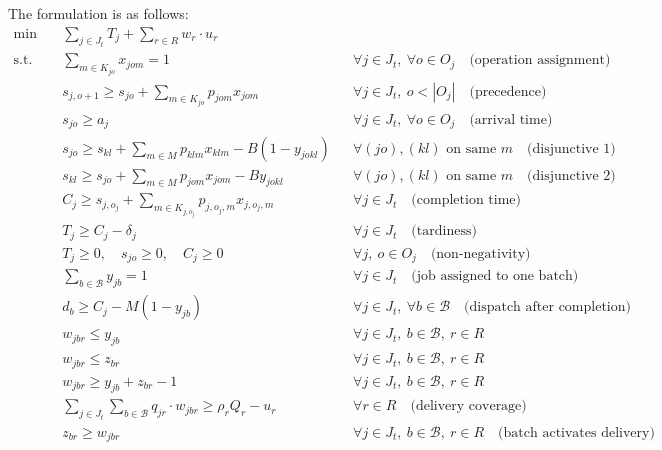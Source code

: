 \documentclass{article}
\begin{document}
The formulation is as follows:
\begin{align}
\min \quad & \sum_{j \in J_t} T_j + \sum_{r \in R} w_r \cdot u_r \\[4pt]
\text{s.t.} \quad
& \sum_{m \in K_{jo}} x_{jom} = 1 && \forall j \in J_t,\ \forall o \in O_j \quad \text{(operation assignment)} \\[4pt]
& s_{j,o+1} \geq s_{jo} + \sum_{m \in K_{jo}} p_{jom} x_{jom} && \forall j \in J_t,\ o < |O_j| \quad \text{(precedence)} \\[4pt]
& s_{jo} \geq a_j && \forall j \in J_t,\ \forall o \in O_j \quad \text{(arrival time)} \\[4pt]
& s_{jo} \geq s_{kl} + \sum_{m \in M} p_{klm} x_{klm} - B (1 - y_{jokl}) && \forall (jo), (kl) \text{ on same } m \quad \text{(disjunctive 1)} \\[4pt]
& s_{kl} \geq s_{jo} + \sum_{m \in M} p_{jom} x_{jom} - B y_{jokl} && \forall (jo), (kl) \text{ on same } m \quad \text{(disjunctive 2)} \\[4pt]
& C_j \geq s_{j,o_j} + \sum_{m \in K_{j,o_j}} p_{j,o_j,m} x_{j,o_j,m} && \forall j \in J_t \quad \text{(completion time)} \\[4pt]
& T_j \geq C_j - \delta_j && \forall j \in J_t \quad \text{(tardiness)} \\[4pt]
& T_j \geq 0,\quad s_{jo} \geq 0,\quad C_j \geq 0 && \forall j,\ o \in O_j \quad \text{(non-negativity)} \\[4pt]
%
& \sum_{b \in \mathcal{B}} y_{jb} = 1 && \forall j \in J_t \quad \text{(job assigned to one batch)} \\[4pt]
& d_b \geq C_j - M(1 - y_{jb}) && \forall j \in J_t,\ \forall b \in \mathcal{B} \quad \text{(dispatch after completion)} \\[4pt]
%
& w_{jbr} \leq y_{jb} && \forall j \in J_t,\ b \in \mathcal{B},\ r \in R \label{con:w1} \\[2pt]
& w_{jbr} \leq z_{br} && \forall j \in J_t,\ b \in \mathcal{B},\ r \in R \label{con:w2} \\[2pt]
& w_{jbr} \geq y_{jb} + z_{br} - 1 && \forall j \in J_t,\ b \in \mathcal{B},\ r \in R \label{con:w3} \\[4pt]
& \sum_{j \in J_t} \sum_{b \in \mathcal{B}} q_{jr} \cdot w_{jbr} \geq \rho_r Q_r - u_r && \forall r \in R \quad \text{(delivery coverage)} \\[4pt]
& z_{br} \geq w_{jbr} && \forall j \in J_t,\ b \in \mathcal{B},\ r \in R \quad \text{(batch activates delivery)} 
\end{align}
\end{document}
